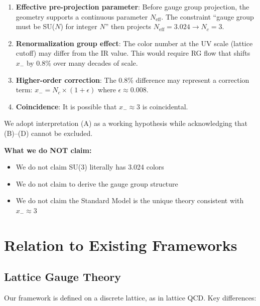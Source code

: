 \documentclass[11pt,a4paper]{article}
\theoremstyle{definition}
\theoremstyle{remark}
\newcommand{\Neff}{N_{\text{eff}}}
\begin{document}
\begin{enumerate}[label=(\Alph*)]
    \item \textbf{Effective pre-projection parameter}: Before gauge group projection, the geometry supports a continuous parameter $\Neff$. The constraint ``gauge group must be SU($N$) for integer $N$'' then projects $\Neff = 3.024 \to N_c = 3$.

    \item \textbf{Renormalization group effect}: The color number at the UV scale (lattice cutoff) may differ from the IR value. This would require RG flow that shifts $x_-$ by 0.8\% over many decades of scale.

    \item \textbf{Higher-order correction}: The 0.8\% difference may represent a correction term: $x_- = N_c \times (1 + \epsilon)$ where $\epsilon \approx 0.008$.

    \item \textbf{Coincidence}: It is possible that $x_- \approx 3$ is coincidental.
\end{enumerate}

We adopt interpretation (A) as a working hypothesis while acknowledging that (B)--(D) cannot be excluded.

\textbf{What we do NOT claim:}
\begin{itemize}
    \item We do not claim SU(3) literally has 3.024 colors
    \item We do not claim to derive the gauge group structure
    \item We do not claim the Standard Model is the unique theory consistent with $x_- \approx 3$
\end{itemize}

\section{Relation to Existing Frameworks}

\subsection{Lattice Gauge Theory}

Our framework is defined on a discrete lattice, as in lattice QCD. Key differences:
\end{document}
